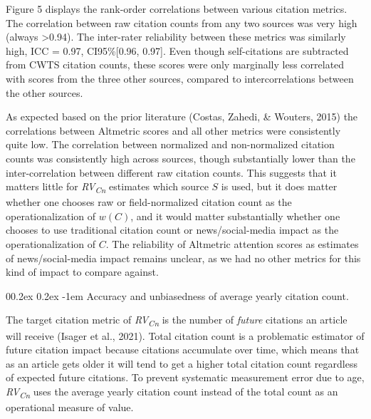 \documentclass[
  man,floatsintext]{apa6}
\makeatletter
\let\oldparagraph\paragraph
\renewcommand{\paragraph}[1]{\oldparagraph{#1}\mbox{}}
\renewcommand{\paragraph}{\@startsection{paragraph}{4}{\parindent}%
  {0\baselineskip \@plus 0.2ex \@minus 0.2ex}%
  {-1em}%
  {\normalfont\normalsize\bfseries\itshape\typesectitle}}
\makeatother
\begin{document}
Figure 5 displays the rank-order correlations between various citation metrics. The correlation between raw citation counts from any two sources was very high (always \textgreater0.94). The inter-rater reliability between these metrics was similarly high, ICC = 0.97, CI95\%{[}0.96, 0.97{]}. Even though self-citations are subtracted from CWTS citation counts, these scores were only marginally less correlated with scores from the three other sources, compared to intercorrelations between the other sources.

As expected based on the prior literature (Costas, Zahedi, \& Wouters, 2015) the correlations between Altmetric scores and all other metrics were consistently quite low. The correlation between normalized and non-normalized citation counts was consistently high across sources, though substantially lower than the inter-correlation between different raw citation counts. This suggests that it matters little for \emph{RV\textsubscript{Cn}} estimates which source \(S\) is used, but it does matter whether one chooses raw or field-normalized citation count as the operationalization of \(w(C)\), and it would matter substantially whether one chooses to use traditional citation count or news/social-media impact as the operationalization of \(C\). The reliability of Altmetric attention scores as estimates of news/social-media impact remains unclear, as we had no other metrics for this kind of impact to compare against.

\hypertarget{accuracy-and-unbiasedness-of-average-yearly-citation-count.}{%
\paragraph{Accuracy and unbiasedness of average yearly citation count.}\label{accuracy-and-unbiasedness-of-average-yearly-citation-count.}}

The target citation metric of \emph{RV\textsubscript{Cn}} is the number of \emph{future} citations an article will receive (Isager et al., 2021). Total citation count is a problematic estimator of future citation impact because citations accumulate over time, which means that as an article gets older it will tend to get a higher total citation count regardless of expected future citations. To prevent systematic measurement error due to age, \emph{RV\textsubscript{Cn}} uses the average yearly citation count instead of the total count as an operational measure of value.
\end{document}
